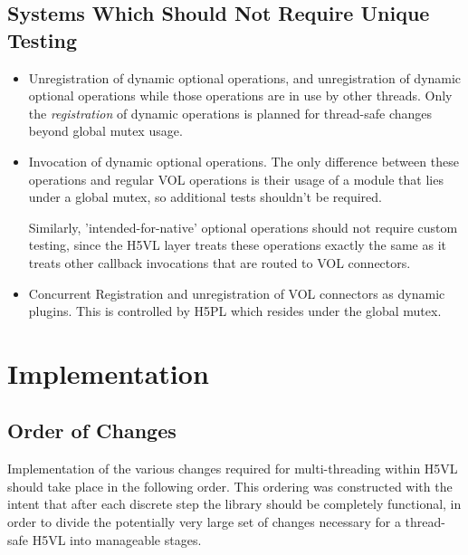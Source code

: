 \documentclass{article}
\begin{document}
\subsection{Systems Which Should Not Require Unique Testing}

\begin{itemize}
     \item Unregistration of dynamic optional operations, and unregistration of dynamic optional operations while those operations are in use by other threads. Only the \textit{registration} of dynamic operations is planned for thread-safe changes beyond global mutex usage.


    \item Invocation of dynamic optional operations. The only difference between these operations and regular VOL operations is their usage of a module that lies under a global mutex, so additional tests shouldn't be required. 

    Similarly, 'intended-for-native' optional operations should not require custom testing, since the H5VL layer treats these operations exactly the same as it treats other callback invocations that are routed to VOL connectors.

     \item Concurrent Registration and unregistration of VOL connectors as dynamic plugins. This is controlled by H5PL which resides under the global mutex.

\end{itemize}


\section{Implementation}

\subsection{Order of Changes}

Implementation of the various changes required for multi-threading within H5VL should take place in the following order. This ordering was constructed with the intent that after each discrete step the library should be completely functional, in order to divide the potentially very large set of changes necessary for a thread-safe H5VL into manageable stages.
\end{document}
